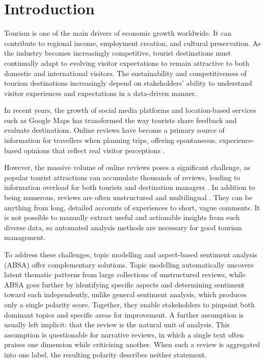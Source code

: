 \documentclass[pdflatex,sn-mathphys-num]{sn-jnl}
\begin{document}

\maketitle

\section{Introduction}\label{sec1}

Tourism is one of the main drivers of economic growth worldwide. It can contribute to regional income, employment creation, and cultural preservation. As the industry becomes increasingly competitive, tourist destinations must continually adapt to evolving visitor expectations to remain attractive to both domestic and international visitors. The sustainability and competitiveness of tourism destinations increasingly depend on stakeholders' ability to understand visitor experiences and expectations in a data-driven manner.

In recent years, the growth of social media platforms and location-based services such as Google Maps has transformed the way tourists share feedback and evaluate destinations. Online reviews have become a primary source of information for travellers when planning trips, offering spontaneous, experience-based opinions that reflect real visitor perceptions \cite{bib1}.

However, the massive volume of online reviews poses a significant challenge, as popular tourist attractions can accumulate thousands of reviews, leading to information overload for both tourists and destination managers \cite{bib2}. In addition to being numerous, reviews are often unstructured and multilingual \cite{bib3,bib4}. They can be anything from long, detailed accounts of experiences to short, vague comments. It is not possible to manually extract useful and actionable insights from such diverse data, so automated analysis methods are necessary for good tourism management.

To address these challenges, topic modelling and aspect-based sentiment analysis (ABSA) offer complementary solutions. Topic modelling automatically uncovers latent thematic patterns from large collections of unstructured reviews, while ABSA goes further by identifying specific aspects and determining sentiment toward each independently, unlike general sentiment analysis, which produces only a single polarity score. Together, they enable stakeholders to pinpoint both dominant topics and specific areas for improvement. A further assumption is usually left implicit: that the review is the natural unit of analysis. This assumption is questionable for narrative reviews, in which a single text often praises one dimension while criticising another. When such a review is aggregated into one label, the resulting polarity describes neither statement.
\end{document}

